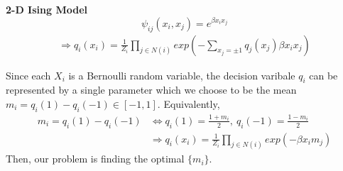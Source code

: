 \documentclass[11pt]{elegantbook}
\begin{document}
\textbf{2-D Ising Model}
$$\psi_{ij}(x_i,x_j)=e^{\beta x_ix_j}$$
\begin{equation}
    \begin{aligned}
        \Rightarrow q_i(x_i)=\frac{1}{Z_i}\prod_{j\in N(i)}exp\left(-\sum_{x_j=\pm 1}q_j(x_j)\beta x_i x_j\right)
    \end{aligned}
    \nonumber
\end{equation}

Since each $X_i$ is a Bernoulli random variable, the decision varibale $q_i$ can be represented by a single parameter which we choose to be the mean $m_i = q_i(1) - q_i(-1) \in [-1, 1]$. Equivalently,
\begin{equation}
    \begin{aligned}
        m_i = q_i(1) - q_i(-1)&\Leftrightarrow q_i(1)=\frac{1+m_i}{2},\ q_i(-1)=\frac{1-m_i}{2}\\
        &\Rightarrow q_i(x_i)=\frac{1}{Z_i}\prod_{j\in N(i)}exp\left(-\beta x_i m_j\right)
    \end{aligned}
    \nonumber
\end{equation}
Then, our problem is finding the optimal $\{m_i\}$.
\end{document}
